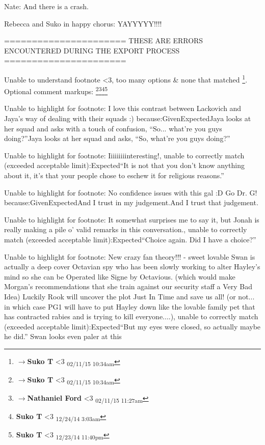 Nate: And there is a crash.

Rebecca and Suko in happy chorus: YAYYYYY!!!!


\iffalse

======================
THESE ARE ERRORS ENCOUNTERED DURING THE EXPORT PROCESS
======================

	Unable to understand footnote <3, too many options & none that matched \footnote{$\rightarrow$\textbf{Suko T }<3 \textsubscript{02/11/15 10:34am}}. Optional comment markups: \footnote{$\rightarrow$\textbf{Suko T }<3 \textsubscript{02/11/15 10:34am}}\footnote{$\rightarrow$\textbf{Nathaniel Ford }<3 \textsubscript{02/11/15 11:27am}}\footnote{\textbf{Suko T }<3 \textsubscript{12/24/14 3:03am}}\footnote{\textbf{Suko T }<3 \textsubscript{12/23/14 11:40pm}} 

	Unable to highlight for footnote: I love this contrast between Lackovich and Jaya's way of dealing with their squads :) because:GivenExpectedJaya looks at her squad and asks with a touch of confusion, “So... what’re you guys doing?”Jaya looks at her squad and asks, “So, what’re you guys doing?”

	Unable to highlight for footnote: Iiiiiiiiinteresting!, unable to correctly match (exceeded acceptable limit):Expected“It is not that you don’t know anything about it, it’s that your people chose to eschew it for religious reasons.”

	Unable to highlight for footnote: No confidence issues with this gal :D  Go Dr. G! because:GivenExpectedAnd I trust in my judgement.And I trust that judgement.

	Unable to highlight for footnote: It somewhat surprises me to say it, but Jonah is really making a pile o' valid remarks in this conversation., unable to correctly match (exceeded acceptable limit):Expected“Choice again.  Did I have a choice?”

	Unable to highlight for footnote: New crazy fan theory!!! - sweet lovable Swan  is actually a deep cover Octavian spy who has been slowly working to alter Hayley's mind so she can be Operated like Signe by Octavious.  (which would make Morgan's recommendations that she train against our security staff a Very Bad Idea)  Luckily Rook will uncover the plot Just In Time and save us all!  (or not... in which case PG1 will have to put Hayley down like the lovable family pet that has contracted rabies and is trying to kill everyone....), unable to correctly match (exceeded acceptable limit):Expected“But my eyes were closed, so actually maybe he did.”
Swan looks even paler at this

